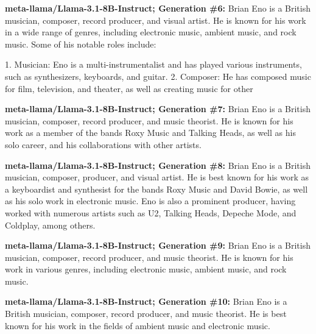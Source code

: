 \documentclass{article} %
\newcommand{\known}[1]{\textcolor{KnownGreen}{#1}}
\begin{document}
\begin{tcolorbox}[
    colback=white,
    colframe=lightblue,
    arc=10pt,
    boxrule=3pt,
    left=10pt,
    right=10pt,
    top=10pt,
    bottom=10pt
]
\vspace{8pt}
\noindent\faRobot \hspace{5pt} \textbf{meta-llama/Llama-3.1-8B-Instruct; Generation \#6:}
Brian Eno is a British musician, \known{composer, record producer}, and visual artist. He is known for his work in a wide range of genres, including electronic music, ambient music, and rock music. Some of his notable roles include:

1. Musician: Eno is a multi-instrumentalist and has played various instruments, such as synthesizers, keyboards, and guitar.
2. Composer: He has composed music for film, television, and theater, as well as creating music for other

\vspace{8pt}
\noindent\faRobot \hspace{5pt} \textbf{meta-llama/Llama-3.1-8B-Instruct; Generation \#7:}
Brian Eno is a British musician, \known{composer, record producer}, and music theorist. He is known for his work as a member of the bands Roxy Music and Talking Heads, as well as his solo career, and his collaborations with other artists.

\vspace{8pt}
\noindent\faRobot \hspace{5pt} \textbf{meta-llama/Llama-3.1-8B-Instruct; Generation \#8:}
Brian Eno is a British musician, \known{composer, producer,} and visual artist. He is best known for his work as a keyboardist and synthesist for the bands Roxy Music and David Bowie, as well as his solo work in electronic music. Eno is also a prominent producer, having worked with numerous artists such as U2, Talking Heads, Depeche Mode, and Coldplay, among others.

\vspace{8pt}
\noindent\faRobot \hspace{5pt} \textbf{meta-llama/Llama-3.1-8B-Instruct; Generation \#9:}
Brian Eno is a British musician, \known{composer, record producer}, and music theorist. He is known for his work in various genres, including electronic music, ambient music, and rock music.

\vspace{8pt}
\noindent\faRobot \hspace{5pt} \textbf{meta-llama/Llama-3.1-8B-Instruct; Generation \#10:}
Brian Eno is a British musician, \known{composer, record producer}, and music theorist. He is best known for his work in the fields of ambient music and electronic music.

\end{tcolorbox}
\end{document}
